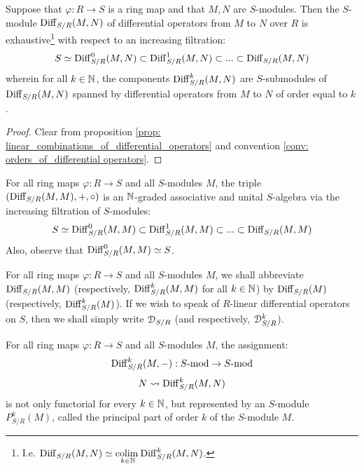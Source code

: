             \begin{proposition} \label{prop: filtering_differential_operators_by_orders}
                Suppose that $\varphi:  R \to S$ is a ring map and that $M, N$ are $S$-modules. Then the $S$-module $\mathrm{Diff}_{S/R}(M, N)$ of differential operators from $M$ to $N$ over $R$ is exhaustive\footnote{I.e. $\mathrm{Diff}_{S/R}(M, N) \simeq \underset{k \in \mathbb{N}}{\operatorname{colim} \:} \mathrm{Diff}_{S/R}^k(M, N)$.} with respect to an increasing filtration:
                    $$S \simeq \mathrm{Diff}_{S/R}^0(M, N) \subset \mathrm{Diff}_{S/R}^1(M, N) \subset ... \subset \mathrm{Diff}_{S/R}(M, N)$$
                wherein for all $k \in \mathbb{N}$, the components $\mathrm{Diff}_{S/R}^k(M, N)$ are $S$-submodules of $\mathrm{Diff}_{S/R}(M, N)$ spanned by differential operators from $M$ to $N$ of order equal to $k$. 
            \end{proposition}
                \begin{proof}
                    Clear from proposition \ref{prop: linear_combinations_of_differential_operators} and convention \ref{conv: orders_of_differential operators}.
                \end{proof}
            \begin{corollary} \label{coro: rings_of_differential_operators}
                For all ring maps $\varphi: R \to S$ and all $S$-modules $M$, the triple $(\mathrm{Diff}_{S/R}(M, M), +, \circ)$ is an $\mathbb{N}$-graded associative and unital $S$-algebra via the increasing filtration of $S$-modules:
                    $$S \simeq \mathrm{Diff}_{S/R}^0(M, M) \subset \mathrm{Diff}_{S/R}^1(M, M) \subset ... \subset \mathrm{Diff}_{S/R}(M, M)$$
                Also, observe that $\mathrm{Diff}_{S/R}^0(M, M) \simeq S$.
            \end{corollary}
            \begin{convention} \label{conv: shorthands_for_rings_of_differential_operators}
                For all ring maps $\varphi: R \to S$ and all $S$-modules $M$, we shall abbreviate $\mathrm{Diff}_{S/R}(M, M)$ (respectively, $\mathrm{Diff}_{S/R}^k(M, M)$ for all $k \in \mathbb{N}$) by $\mathrm{Diff}_{S/R}(M)$ (respectively, $\mathrm{Diff}_{S/R}^k(M)$). If we wish to speak of $R$-linear differential operators on $S$, then we shall simply write $\mathcal{D}_{S/R}$ (and respectively, $\mathcal{D}_{S/R}^k$).
            \end{convention}
            \begin{proposition} \label{prop: principal_parts}
                For all ring maps $\varphi: R \to S$ and all $S$-modules $M$, the assignment:
                    $$\mathrm{Diff}_{S/R}^k(M, -): S\text{-}\mathrm{mod} \to S\text{-}\mathrm{mod}$$
                    $$N \leadsto \mathrm{Diff}_{S/R}^k(M, N)$$
                is not only functorial for every $k \in \mathbb{N}$, but represented by an $S$-module $P_{S/R}^k(M)$, called the principal part of order $k$ of the $S$-module $M$.
            \end{proposition}
